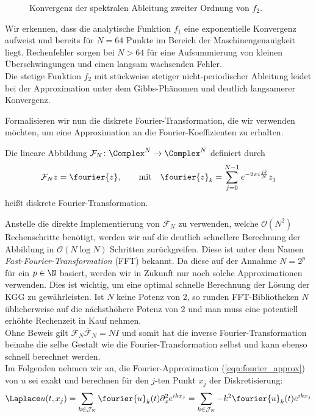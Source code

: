 \begin{mathbsp}
\begin{figure}[!htb]
  \caption{Konvergenz der spektralen Ableitung zweiter Ordnung von $f_2$.}
\end{figure}
Wir erkennen, dass die analytische Funktion $f_1$ eine exponentielle Konvergenz aufweist und bereits für $N=64$ Punkte im Bereich der Maschinengenauigkeit liegt. Rechenfehler sorgen bei $N>64$ für eine Aufsummierung von kleinen Überschwingungen und einen langsam wachsenden Fehler.\\
Die stetige Funktion $f_2$ mit stückweise stetiger nicht-periodischer Ableitung leidet bei der Approximation unter dem Gibbs-Phänomen und deutlich langsamerer Konvergenz.
\end{mathbsp}

Formalisieren wir nun die diskrete Fourier-Transformation, die wir verwenden möchten, um eine Approximation an die Fourier-Koeffizienten zu erhalten.
\begin{mathdef}
Die lineare Abbildung $\mathcal{F}_N\colon\Complex^N\to\Complex^N$ definiert durch
\[\mathcal{F}_Nz=\fourier{z},\qquad\text{mit}\quad \fourier{z}_k=\sum_{j=0}^{N-1}e^{-2\pi i\frac{jk}{N}}z_j\]
heißt diskrete Fourier-Transformation.
\end{mathdef}
Anstelle die direkte Implementierung von $\mathcal{F}_N$ zu verwenden, welche $\mathcal{O}(N^2)$ Rechenschritte benötigt, werden wir auf die deutlich schnellere Berechnung der Abbildung in $\mathcal{O}(N\log N)$ Schritten zurückgreifen. Diese ist unter dem Namen \emph{Fast-Fourier-Transformation} (FFT) bekannt. Da diese auf der Annahme $N=2^p$ für ein $p\in\N$ basiert, werden wir in Zukunft nur noch solche Approximationen verwenden. Dies ist wichtig, um eine optimal schnelle Berechnung der Lösung der KGG zu gewährleisten. Ist $N$ keine Potenz von 2, so runden FFT-Bibliotheken $N$ üblicherweise auf die nächsthöhere Potenz von 2 und man muss eine potentiell erhöhte Rechenzeit in Kauf nehmen.\\
Ohne Beweis gilt $\mathcal{F}_N\overline{\mathcal{F}}_N=NI$ und somit hat die inverse Fourier-Transformation beinahe die selbe Gestalt wie die Fourier-Transformation selbst und kann ebenso schnell berechnet werden.\\
Im Folgenden nehmen wir an, die Fourier-Approximation (\ref{eqn:fourier_approx}) von $u$ sei exakt und berechnen für den $j$-ten Punkt $x_j$ der Diskretisierung:
\begin{equation}
\label{eqn:laplace_approxu}
\Laplace u(t,x_j)=\sum_{k\in\mathcal{J}_N}\fourier{u}_k(t)\partial^2_x e^{ikx_j}=\sum_{k\in\mathcal{J}_N}-k^2\fourier{u}_k(t)e^{ikx_j}
\end{equation}
